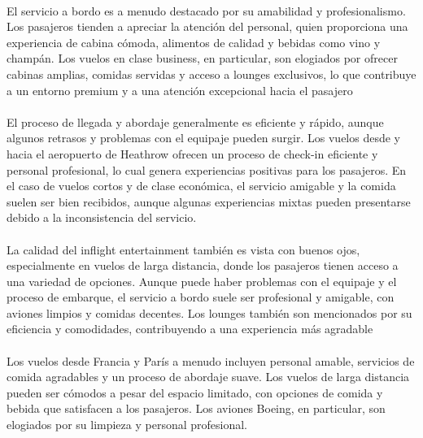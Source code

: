 \documentclass{report}
\begin{document}
{{                    \paragraph*{}{
                        El servicio a bordo es a menudo destacado por su amabilidad y profesionalismo. Los pasajeros tienden a apreciar la atención del personal, quien proporciona una experiencia de cabina cómoda, alimentos de calidad y bebidas como vino y champán. Los vuelos en clase business, en particular, son elogiados por ofrecer cabinas amplias, comidas servidas y acceso a lounges exclusivos, lo que contribuye a un entorno premium y a una atención excepcional hacia el pasajero
                    }
                    \paragraph*{}{
                        El proceso de llegada y abordaje generalmente es eficiente y rápido, aunque algunos retrasos y problemas con el equipaje pueden surgir. Los vuelos desde y hacia el aeropuerto de Heathrow ofrecen un proceso de check-in eficiente y personal profesional, lo cual genera experiencias positivas para los pasajeros. En el caso de vuelos cortos y de clase económica, el servicio amigable y la comida suelen ser bien recibidos, aunque algunas experiencias mixtas pueden presentarse debido a la inconsistencia del servicio.
                    }
                    \paragraph*{}{
                        La calidad del inflight entertainment también es vista con buenos ojos, especialmente en vuelos de larga distancia, donde los pasajeros tienen acceso a una variedad de opciones. Aunque puede haber problemas con el equipaje y el proceso de embarque, el servicio a bordo suele ser profesional y amigable, con aviones limpios y comidas decentes. Los lounges también son mencionados por su eficiencia y comodidades, contribuyendo a una experiencia más agradable
                    }
                    \paragraph*{}{
                        Los vuelos desde Francia y París a menudo incluyen personal amable, servicios de comida agradables y un proceso de abordaje suave. Los vuelos de larga distancia pueden ser cómodos a pesar del espacio limitado, con opciones de comida y bebida que satisfacen a los pasajeros. Los aviones Boeing, en particular, son elogiados por su limpieza y personal profesional.
                    }
}}
\end{document}
